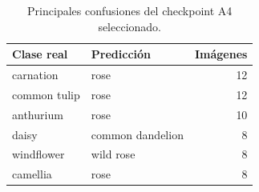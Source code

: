 \begin{table}[htbp]
\centering
\small
\caption{Principales confusiones del checkpoint A4 seleccionado.}
\label{tab:confusiones}
\begin{tabular}{llr}
\toprule
Clase real & Predicción & Imágenes \\
\midrule
carnation & rose & 12 \\
common tulip & rose & 12 \\
anthurium & rose & 10 \\
daisy & common dandelion & 8 \\
windflower & wild rose & 8 \\
camellia & rose & 8 \\
\bottomrule
\end{tabular}
\end{table}

